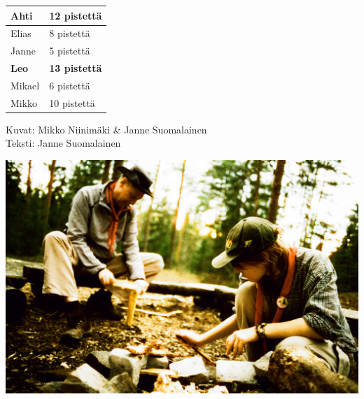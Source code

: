 \begin{multicols}{2}
\begin{center}
\begin{tabular}{ |l|l| }
	\hline
	Ahti & 12 pistettä \\
	\hline
	Elias & 8 pistettä \\
	\hline
	Janne & 5 pistettä \\
	\hline
	\textbf{Leo} & \textbf{13 pistettä} \\
	\hline
	Mikael & 6 pistettä \\
	\hline
	Mikko & 10 pistettä \\
	\hline
\end{tabular}
\end{center}

\end{multicols}

{\raggedleft Kuvat: Mikko Niinimäki \& Janne Suomalainen\\ Teksti: Janne Suomalainen\par}

\vspace*{0.32cm}
\vspace*{0.16cm}
\noindent\includegraphics[width=\linewidth]{assets/vene03}

